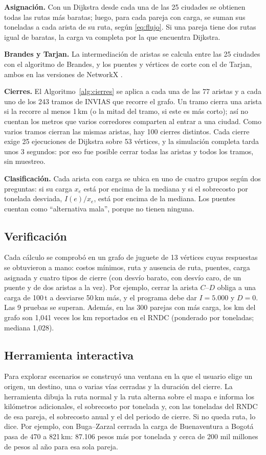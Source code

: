 \documentclass[conference]{IEEEtran}
\begin{document}
\textbf{Asignación.} Con un Dijkstra desde cada una de las 25 ciudades se
obtienen todas las rutas más baratas; luego, para cada pareja con carga, se
suman sus toneladas a cada arista de su ruta, según \eqref{eq:flujo}. Si una
pareja tiene dos rutas igual de baratas, la carga va completa por la que
encuentra Dijkstra.

\textbf{Brandes y Tarjan.} La intermediación de aristas se calcula entre las
25 ciudades con el algoritmo de Brandes, y los puentes y vértices de corte con
el de Tarjan, ambos en las versiones de NetworkX \cite{hagberg2008}.

\textbf{Cierres.} El Algoritmo~\ref{alg:cierres} se aplica a cada una de las
77 aristas y a cada uno de los 243 tramos de INVIAS que recorre el grafo. Un
tramo cierra una arista si la recorre al menos 1\,km (o la mitad del tramo, si
este es más corto); así no cuentan los metros que varios corredores comparten
al entrar a una ciudad. Como varios tramos cierran las mismas aristas, hay 100
cierres distintos. Cada cierre exige 25 ejecuciones de Dijkstra sobre 53
vértices, y la simulación completa tarda unos 3 segundos: por eso fue posible
cerrar todas las aristas y todos los tramos, sin muestreo.

\textbf{Clasificación.} Cada arista con carga se ubica en uno de cuatro grupos
según dos preguntas: si su carga $x_e$ está por encima de la mediana y si el
sobrecosto por tonelada desviada, $I(e)/x_e$, está por encima de la mediana.
Los puentes cuentan como ``alternativa mala'', porque no tienen ninguna.

\subsection{Verificación}
Cada cálculo se comprobó en un grafo de juguete de 13 vértices cuyas
respuestas se obtuvieron a mano: costos mínimos, ruta y ausencia de ruta,
puentes, carga asignada y cuatro tipos de cierre (con desvío barato, con desvío
caro, de un puente y de dos aristas a la vez). Por ejemplo, cerrar la arista
$C$--$D$ obliga a una carga de 100\,t a desviarse 50\,km más, y el programa
debe dar $I=5.000$ y $D=0$. Las 9 pruebas se superan. Además, en las 300
parejas con más carga, los km del grafo son 1,041 veces los km reportados en
el RNDC (ponderado por toneladas; mediana 1,028).

\subsection{Herramienta interactiva}
Para explorar escenarios se construyó una ventana en la que el usuario elige
un origen, un destino, una o varias vías cerradas y la duración del cierre. La
herramienta dibuja la ruta normal y la ruta alterna sobre el mapa e informa
los kilómetros adicionales, el sobrecosto por tonelada y, con las toneladas del
RNDC de esa pareja, el sobrecosto anual y el del periodo de cierre. Si no
queda ruta, lo dice. Por ejemplo, con Buga--Zarzal cerrada la carga de
Buenaventura a Bogotá pasa de 470 a 821\,km: 87.106 pesos más por tonelada y
cerca de 200 mil millones de pesos al año para esa sola pareja.
\end{document}
